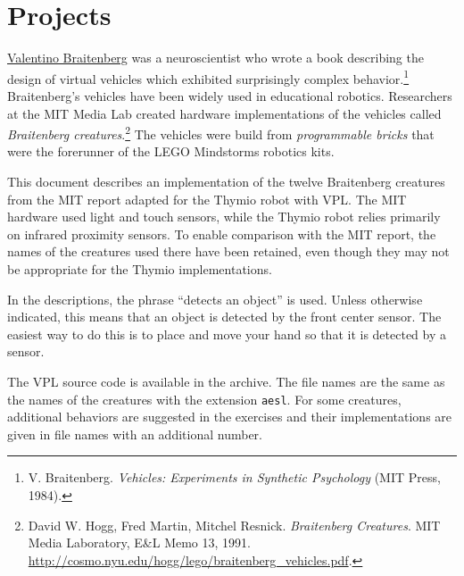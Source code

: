 \part{Projects}

\label{ch.brait}


\href{http://en.wikipedia.org/wiki/Valentino_Braitenberg}{Valentino
Braitenberg} was a neuroscientist who wrote a book describing
the design of virtual vehicles which exhibited surprisingly complex
behavior.\footnote{V. Braitenberg. \textit{Vehicles: Experiments in
Synthetic Psychology} (MIT Press, 1984).} Braitenberg's vehicles have
been widely used in educational robotics. Researchers at the MIT Media
Lab created hardware implementations of the vehicles called
\emph{Braitenberg creatures}.\footnote{David W. Hogg, Fred Martin,
Mitchel Resnick. \textit{Braitenberg Creatures}. MIT Media Laboratory,
E\&L Memo 13, 1991.
\href{http://cosmo.nyu.edu/hogg/lego/braitenberg_vehicles.pdf}{http://cosmo.nyu.edu/hogg/lego/braitenberg\_vehicles.pdf}.} The
vehicles were build from \emph{programmable bricks} that were the
forerunner of the LEGO Mindstorms robotics kits.

This document describes an implementation of the twelve Braitenberg
creatures from the MIT report adapted for the Thymio robot with VPL. The
MIT hardware used light and touch sensors, while the Thymio robot relies
primarily on infrared proximity sensors. To enable comparison with the
MIT report, the names of the creatures used there have been retained,
even though they may not be appropriate for the Thymio implementations.

In the descriptions, the phrase ``detects an object'' is used. Unless
otherwise indicated, this means that an object is detected by the front
center sensor. The easiest way to do this is to place and move your hand
so that it is detected by a sensor.

The \textsc{VPL} source code is available in the archive. The file names
are the same as the names of the creatures with the extension
\texttt{\small aesl}. For some creatures, additional behaviors are
suggested in the exercises and their implementations are given in file
names with an additional number.


